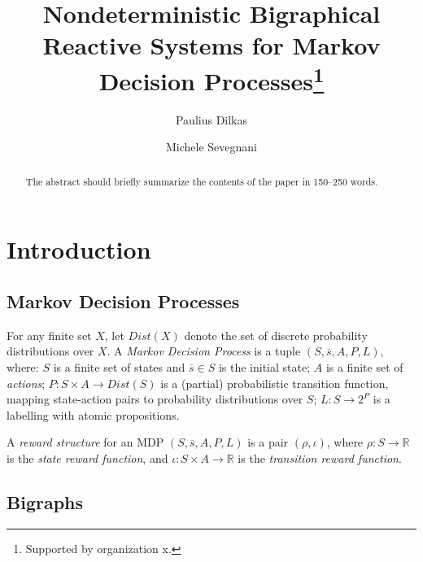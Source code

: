 \documentclass[runningheads]{llncs}
\newcommand\Dist{\mathit{Dist}}
\begin{document}
\title{Nondeterministic Bigraphical Reactive Systems for Markov Decision
  Processes\thanks{Supported by organization x.}}
\author{Paulius Dilkas \and Michele Sevegnani}
\maketitle

\begin{abstract}
The abstract should briefly summarize the contents of the paper in
150--250 words.

\end{abstract}

\section{Introduction}

\subsection{Markov Decision Processes}

\begin{definition} \label{mdp}
  For any finite set $X$, let $\Dist(X)$ denote the set of discrete probability
  distributions over $X$. A \emph{Markov Decision Process} is a tuple $ (S,
  \overline{s}, A, P, L)$, where: $S$ is a finite set of states and
  $\overline{s} \in S$ is the initial state; $A$ is a finite set of
  \emph{actions}; $P : S \times A \to \Dist(S)$ is a (partial) probabilistic
  transition function, mapping state-action pairs to probability distributions
  over $S$; $L : S \to 2^P$ is a labelling with atomic propositions.
\end{definition}

\begin{definition}[rewards]
  A \emph{reward structure} for an MDP $(S, \overline{s}, A, P, L)$ is a pair
  $(\rho, \iota)$, where $\rho : S \to \mathbb{R}$ is the \emph{state reward
    function}, and $\iota : S \times A \to \mathbb{R}$ is the \emph{transition
    reward function}.
\end{definition}

\subsection{Bigraphs}
\end{document}
